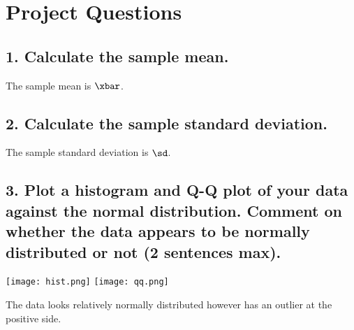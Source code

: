 \documentclass[12pt,oneside]{book}
\begin{document}
\section*{Project Questions}
\hspace*{.02\textwidth}%
\begin{minipage}{.96\textwidth}
\subsection*{1. Calculate the sample mean.}
The sample mean is $\xbar$.

\subsection*{2. Calculate the sample standard deviation.}
The sample standard deviation is $\sd$.

\subsection*{3. Plot a histogram and Q-Q plot of your data against the normal distribution. Comment
on whether the data appears to be normally distributed or not (2 sentences max).}
\begin{center}
\texttt{[image: hist.png]}
\texttt{[image: qq.png]}
\end{center}
The data looks relatively normally distributed however has an outlier at the positive side.
\end{minipage}%
\newpage
\end{document}
